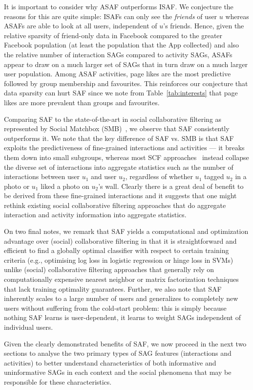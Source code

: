 It is important to consider why ASAF outperforms ISAF.  We conjecture
the reasons for this are quite simple: ISAFs can only see the
\emph{friends} of user $u$ whereas ASAFs are able to look at all
users, independent of $u$'s friends.  Hence, given the relative
sparsity of friend-only data in Facebook compared to the greater
Facebook population (at least the population that the App collected)
and also the relative number of interaction SAGs compared to
activity SAGs, ASAFs appear to draw on a much larger set of SAGs that
in turn draw on a much larger user population.  Among ASAF activities,
page likes are the most predictive followed by group membership and
favourites.  This reinforces our conjecture that data sparsity 
can hurt SAF since we note from Table~\ref{tab:interests} that page likes are
more prevalent than groups and favourites.

Comparing SAF to the state-of-the-art in social collaborative
filtering as represented by Social Matchbox (SMB)~\cite{Noel2012NOF},
we observe that SAF consistently outperforms it.  We note that the key
difference of SAF vs. SMB is that SAF exploits the predictiveness of
fine-grained interactions and activities --- it breaks them down into
small subgroups, whereas most SCF
approaches~\cite{socinf,rrmf,ste,sorec,sr,Noel2012NOF,lla} instead
collapse the diverse set of interactions into aggregate statistics
such as the number of interactions between user $u_1$ and user $u_2$,
regardless of whether $u_1$ tagged $u_2$ in a photo or $u_1$ liked a
photo on $u_2$'s wall.  Clearly there is a great deal of benefit to be
derived from these fine-grained interactions and it suggests that one
might rethink existing social collaborative filtering approaches that
do aggregate interaction and activity information into aggregate
statistics.

On two final notes, we remark that SAF yields a computational and
optimization advantage over (social) collaborative filtering in that
it is straightforward and efficient to find a globally optimal
classifier with respect to certain training criteria (e.g., optimising
log loss in logistic regression or hinge loss in SVMs) unlike (social)
collaborative filtering approaches that generally rely on
computationally expensive nearest neighbor or matrix factorization
techniques that lack training optimality guarantees.  Further, we also
note that SAF inherently scales to a large number
of users and generalizes to completely new users without suffering
from the cold-start problem: this is simply because nothing SAF learns
is user-dependent, it learns to weight SAGs independent of individual  
users. %

Given the clearly demonstrated benefits of SAF, we now proceed in the
next two sections to analyse the two primary types of SAG features
(interactions and activities) to better understand characteristics of
both informative and uninformative SAGs in each context and the social
phenomena that may be responsible for these characteristics.
